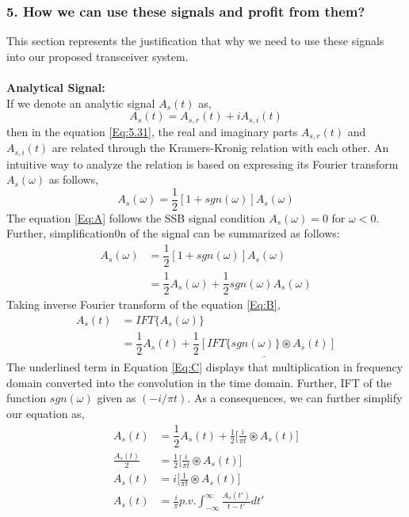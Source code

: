 \subsubsection{5. How we can use these signals and profit from them?}
This section represents the justification that why we need to use these signals into our proposed transceiver system.\\ \\
\textbf{Analytical Signal:}\\
If we denote an analytic signal $A_s(t)$ as, 
\begin{equation}
A_s(t)=A_{s,r}(t)+iA_{s,i}(t)
\label{Eq:5.31}
\end{equation}
then in the equation \ref{Eq:5.31}, the real and imaginary parts $A_{s,r}(t)$ and $A_{s,i}(t)$ are related through the Kramers-Kronig relation with each other. An intuitive way to analyze the relation is based on expressing its Fourier transform $A_s(\omega)$ as follows,
\begin{equation}
A_s(\omega)=\dfrac{1}{2}[1+sgn(\omega)]A_s(\omega)
\label{Eq:A}
\end{equation}
The equation \ref{Eq:A} follows the SSB signal condition $A_s(\omega)=0$ for $\omega<0$. Further, simplification0n of the signal can be summarized as follows:
\begin{equation}
\begin{split}
A_s(\omega)&=\dfrac{1}{2}[1+sgn(\omega)]A_s(\omega)\\
&=\dfrac{1}{2}A_s(\omega)+\dfrac{1}{2}sgn(\omega)A_s(\omega)
\end{split}
\label{Eq:B}
\end{equation}
Taking inverse Fourier transform of the equation \ref{Eq:B},
\begin{equation}
\begin{split}
{A_s}(t)&=IFT\{A_s(\omega)\}\\
&=\dfrac{1}{2}{A_s}(t)+\underline{\dfrac{1}{2}[IFT\{sgn(\omega)\} \circledast {A_s}(t)]}
\end{split}
\label{Eq:C}
\end{equation}
The underlined term in Equation \ref{Eq:C} displays that multiplication in frequency domain converted into the convolution in the time domain. Further, IFT of the function $sgn(\omega)$ given as $(-i/\pi t)$. As a consequences, we can further simplify our equation as,
\begin{equation}
\begin{split}
{A_s}(t)&=\dfrac{1}{2}{A_s}(t)+\frac{1}{2}\bigg[\frac{i}{\pi t} \circledast {A_s}(t) \bigg]\\
\frac{{A_s}(t)}{2} &=\frac{1}{2}\bigg[\frac{i}{\pi t} \circledast {A_s}(t) \bigg]\\
{A_s}(t) &=i\bigg[\frac{1}{\pi t} \circledast {A_s}(t) \bigg]\\
{A_s}(t) &=\frac{i}{\pi} p.v. \int_{-\infty}^{\infty} \frac{A_s(t')}{t-t'} dt' 
\end{split}
\label{Eq:D}
\end{equation}
